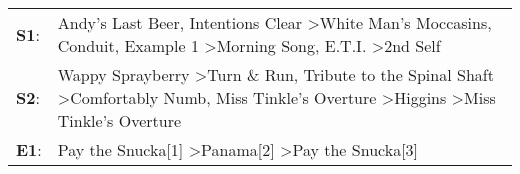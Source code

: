 \begin{supertabular}{p{0.03\textwidth}p{0.92\textwidth}}
 \textbf{S1}:  &           Andy's Last Beer\textsuperscript{}, \enspace Intentions Clear\textsuperscript{} \textgreater \enspace White Man's Moccasins\textsuperscript{}, \enspace Conduit\textsuperscript{}, \enspace Example 1\textsuperscript{} \textgreater \enspace Morning Song\textsuperscript{}, \enspace E.T.I.\textsuperscript{} \textgreater \enspace 2nd Self\textsuperscript{}  \enspace  \\
 \textbf{S2}:  &  Wappy Sprayberry\textsuperscript{} \textgreater \enspace Turn \& Run\textsuperscript{}, \enspace Tribute to the Spinal Shaft\textsuperscript{} \textgreater \enspace Comfortably Numb\textsuperscript{}, \enspace Miss Tinkle's Overture\textsuperscript{} \textgreater \enspace Higgins\textsuperscript{} \textgreater \enspace Miss Tinkle's Overture\textsuperscript{}  \enspace  \\
 \textbf{E1}:  &                                                                                                                                                                                                                            Pay the Snucka[1]\textsuperscript{} \textgreater \enspace Panama[2]\textsuperscript{} \textgreater \enspace Pay the Snucka[3]\textsuperscript{}  \enspace  \\
\end{supertabular}
